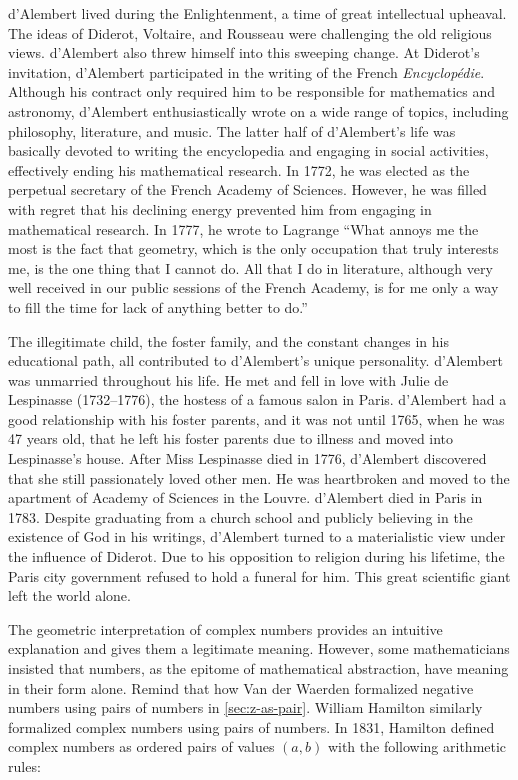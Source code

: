 \documentclass[b5paper]{article}
\begin{document}
\begin{mdframed}
d'Alembert lived during the Enlightenment, a time of great intellectual upheaval. The ideas of Diderot, Voltaire, and Rousseau were challenging the old religious views. d'Alembert also threw himself into this sweeping change. At Diderot's invitation, d'Alembert participated in the writing of the French \emph{Encyclopédie}. Although his contract only required him to be responsible for mathematics and astronomy, d'Alembert enthusiastically wrote on a wide range of topics, including philosophy, literature, and music. The latter half of d'Alembert's life was basically devoted to writing the encyclopedia and engaging in social activities, effectively ending his mathematical research. In 1772, he was elected as the perpetual secretary of the French Academy of Sciences. However, he was filled with regret that his declining energy prevented him from engaging in mathematical research. In 1777, he wrote to Lagrange\cite{MacTour-dAlembert} \enquote{What annoys me the most is the fact that geometry, which is the only occupation that truly interests me, is the one thing that I cannot do. All that I do in literature, although very well received in our public sessions of the French Academy, is for me only a way to fill the time for lack of anything better to do.}

The illegitimate child, the foster family, and the constant changes in his educational path, all contributed to d'Alembert's unique personality. d'Alembert was unmarried throughout his life. He met and fell in love with Julie de Lespinasse (1732–1776), the hostess of a famous salon in Paris. d'Alembert had a good relationship with his foster parents, and it was not until 1765, when he was 47 years old, that he left his foster parents due to illness and moved into Lespinasse's house. After Miss Lespinasse died in 1776, d'Alembert discovered that she still passionately loved other men. He was heartbroken and moved to the apartment of Academy of Sciences in the Louvre\cite{Ronald-2024}. d'Alembert died in Paris in 1783. Despite graduating from a church school and publicly believing in the existence of God in his writings, d'Alembert turned to a materialistic view under the influence of Diderot. Due to his opposition to religion during his lifetime, the Paris city government refused to hold a funeral for him. This great scientific giant left the world alone.
\end{mdframed}

The geometric interpretation of complex numbers provides an intuitive explanation and gives them a legitimate meaning. However, some mathematicians insisted that numbers, as the epitome of mathematical abstraction, have meaning in their form alone. Remind that how Van der Waerden formalized negative numbers using pairs of numbers in \cref{sec:z-as-pair}. William Hamilton similarly formalized complex numbers using pairs of numbers. In 1831, Hamilton defined complex numbers as ordered pairs of values $(a, b)$ with the following arithmetic rules:
\end{document}
